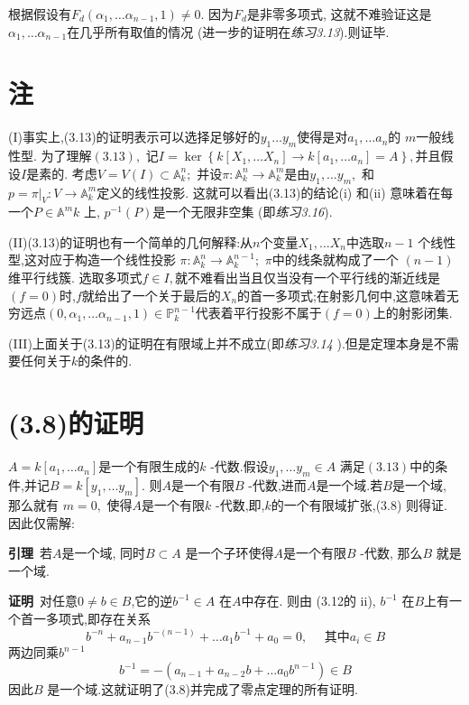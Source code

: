 \documentclass[UTF8]{book}
\begin{document}
		根据假设有$F _{ d }\left(\alpha_{1}, \ldots \alpha_{ n -1}, 1\right) \neq 0 .$ 因为$F _{ d }$是非零多项式, 这就不难验证这是 $\alpha_{1}, \ldots \alpha_{n-1}$在几乎所有取值的情况 (进一步的证明在\textit{练习3.13}).则证毕.
		
		
		
	\section{注}
		(I)事实上,(3.13)的证明表示可以选择足够好的$y_{1} \ldots y_{m}$使得是对$a_{1}, \dots a_{n}$的 $m$一般线性型. 为了理解$(3.13),$ 记$I = \ker \left\{ k \left[ X _{1}, \ldots X _{ n }\right] \rightarrow k \left[ a _{1}, \ldots a _{ n }\right]= A \right\},$并且假设$ I $是素的. 考虑$V = V (I ) \subset \mathbb{A} ^{ n }_{k} ;$ 并设$\pi: \mathbb{A} ^{ n } _{k} \rightarrow \mathbb{A} ^{ m } _{k}$是由$y_{1}, \dots y_{m},$ 和 $p=\pi | _{V}: V \rightarrow \mathbb{A}^{ m}_{k}$定义的线性投影. 这就可以看出(3.13)的结论(i) 和(ii)  意味着在每一个$P \in \mathbb{A} ^{ m } k $ 上, $ p ^{-1}(P )$是一个无限非空集 (即\textit{练习3.16}). 
		
		
		(II)(3.13)的证明也有一个简单的几何解释:从$ n $个变量$X _{1}, \ldots X _{ n }$中选取$n -1$ 个线性型,这对应于构造一个线性投影 $\pi: \mathbb{A} ^{n}_{k} \rightarrow \mathbb{A} ^{n-1}_{k} ;$ $\pi$中的线条就构成了一个 $(n-1)$维平行线簇. 选取多项式$f \in I ,$就不难看出当且仅当没有一个平行线的渐近线是$ (f = 0) $时,$f$就给出了一个关于最后的$X_{n}$的首一多项式;在射影几何中,这意味着无穷远点$\left(0, \alpha_{1}, \dots \alpha_{n-1}, 1\right) \in \mathbb{P} ^{n-1}_{k}$代表着平行投影不属于$ (f = 0) $上的射影闭集.
		
		
		(III)上面关于(3.13)的证明在有限域上并不成立(即\textit{练习3.14 }).但是定理本身是不需要任何关于$ k $的条件的.
		
		
	\section{(3.8)的证明}
		$A=k\left[a_{1}, \ldots a_{n}\right]$是一个有限生成的$k$ -代数.假设$y _{1}, \ldots y _{ m } \in A$ 满足$(3.13)$中的条件,并记$B = k \left[ y _{1},\dots y _{ m }\right] .$ 则$A$是一个有限$B$ -代数,进而$A$是一个域.若$B$是一个域, 那么就有 $m =0,$ 使得$A$是一个有限$k$ -代数,即,$k $的一个有限域扩张,(3.8) 则得证. 因此仅需解:
		
		\textbf{引理}\ 若$A$是一个域, 同时$B \subset A$ 是一个子环使得$A$是一个有限$B$ -代数, 那么$B$ 就是一个域.
		
		\textbf{证明}\ 对任意$0 \neq b \in B$,它的逆$b ^{-1} \in A$ 在$ A $中存在. 则由 (3.12的 ii), $b ^{-1}$ 在$B$上有一个首一多项式,即存在关系
		\begin{equation*}
		b ^{- n }+ a _{ n -1} b ^{-(n -1)}+\ldots a _{1} b ^{-1}+ a _{0}=0, \quad \text { 其中} a _{ i } \in B
		\end{equation*}
		两边同乘$b ^{ n -1}$
		\begin{equation*}
		b ^{-1}=-\left(a _{ n -1}+ a _{ n -2} b +\ldots a _{0} b ^{ n -1}\right) \in B
		\end{equation*}
		因此$B$ 是一个域.这就证明了(3.8)并完成了零点定理的所有证明.
		
\end{document}
